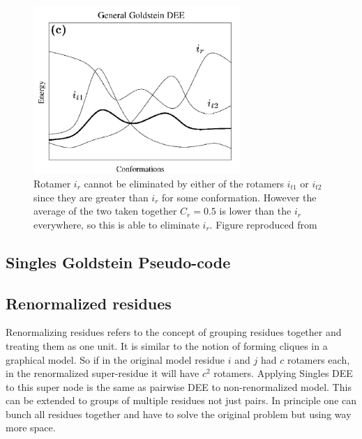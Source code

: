 \documentclass{article}
\begin{document}
\begin{figure}[h!]
    \centering
    \includegraphics[width=0.7\textwidth]{pics/goldgen.pdf}
    \caption{Rotamer $i_r$ cannot be eliminated by either of the rotamers $i_{t1}$ or $i_{t2}$ since they are greater than $i_r$ for some conformation. However the average of the two taken together $C_r=0.5$ is lower than the $i_r$ everywhere, so this is able to eliminate $i_r$.  Figure reproduced from~\cite{Pierce2000}}
    \label{fig:goldstein_gen}
\end{figure}

\pagebreak

\subsection{Singles Goldstein Pseudo-code}

\subsection{Renormalized residues}
Renormalizing residues refers to the concept of grouping residues together and treating them as one unit. It is similar to the notion of forming cliques in a graphical model. So if in the original model residue $i$ and $j$ had $c$ rotamers each, in the renormalized super-residue it will have $c^2$  rotamers. Applying Singles DEE to this super node is the same as pairwise DEE to non-renormalized model. This can be extended to groups of multiple residues not just pairs. In principle one can bunch all residues together and have to solve the original problem but using way more space. 
\end{document}
